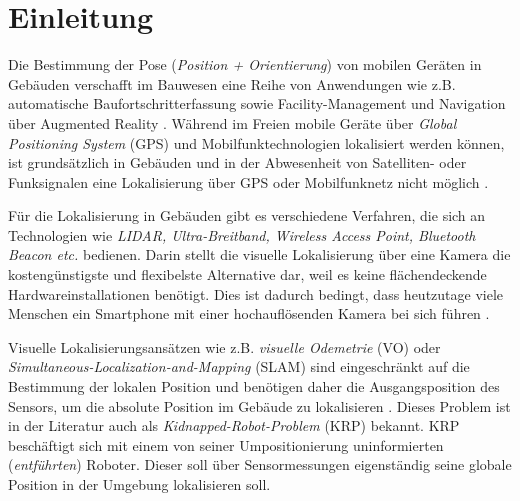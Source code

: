 
\section{Einleitung}
%
%
%
%
%
%
%
%
%
%
%
%
%
%




Die Bestimmung der Pose (\textit{Position + Orientierung}) von mobilen Geräten in Gebäuden verschafft im Bauwesen eine Reihe von Anwendungen wie z.B. automatische Baufortschritterfassung sowie Facility-Management und Navigation über Augmented Reality \cite{kroppModelbasedPoseEstimation2016, kochNaturalMarkersAugmented2014}.
Während im Freien mobile Geräte über \textit{Global Positioning System} (GPS) und Mobilfunktechnologien lokalisiert werden können, ist grundsätzlich in Gebäuden und in der Abwesenheit von Satelliten- oder Funksignalen eine Lokalisierung über GPS oder Mobilfunknetz nicht möglich \cite{yassinRecentAdvancesIndoor2016}. 

Für die Lokalisierung in Gebäuden gibt es verschiedene Verfahren, die sich an Technologien wie  \textit{LIDAR, Ultra-Breitband, Wireless Access Point, Bluetooth Beacon etc.} bedienen. Darin stellt die visuelle Lokalisierung über eine Kamera die kostengünstigste und flexibelste Alternative dar, weil es keine flächendeckende Hardwareinstallationen benötigt. Dies ist dadurch bedingt, dass heutzutage viele Menschen ein Smartphone mit einer hochauflösenden Kamera bei sich führen \cite{wuImagebasedCameraLocalization2018}.

Visuelle Lokalisierungsansätzen wie z.B. 
\textit{visuelle Odemetrie} (VO) oder \textit{Simultaneous-Localization-and-Mapping} (SLAM) sind eingeschränkt auf die Bestimmung der lokalen Position und benötigen daher die Ausgangsposition des Sensors, um die absolute Position im Gebäude zu lokalisieren \cite{stephenseGlobalLocalizationUsing2002}. Dieses Problem ist in der Literatur auch als \textit{Kidnapped-Robot-Problem} (KRP) bekannt. KRP beschäftigt sich mit einem von seiner Umpositionierung uninformierten (\textit{entführten}) Roboter. Dieser soll über Sensormessungen eigenständig seine globale Position in der Umgebung lokalisieren soll.


